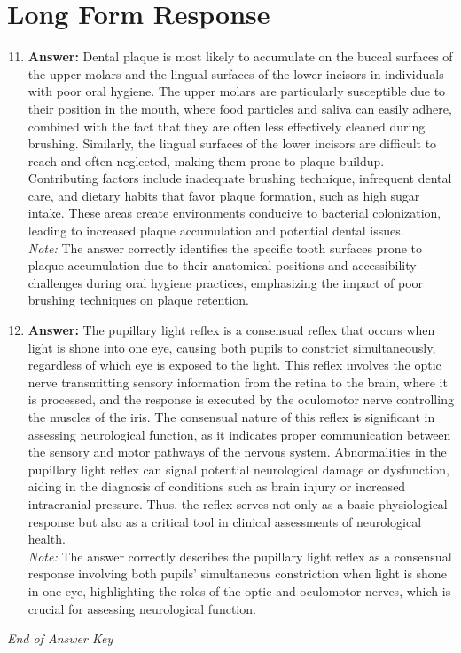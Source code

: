 \documentclass[12pt]{article}
\begin{document}
\section*{Long Form Response}
\begin{enumerate}[label=\arabic*.]
\setcounter{enumi}{10}
\item \textbf{Answer:} Dental plaque is most likely to accumulate on the buccal surfaces of the upper molars and the lingual surfaces of the lower incisors in individuals with poor oral hygiene. The upper molars are particularly susceptible due to their position in the mouth, where food particles and saliva can easily adhere, combined with the fact that they are often less effectively cleaned during brushing. Similarly, the lingual surfaces of the lower incisors are difficult to reach and often neglected, making them prone to plaque buildup. Contributing factors include inadequate brushing technique, infrequent dental care, and dietary habits that favor plaque formation, such as high sugar intake. These areas create environments conducive to bacterial colonization, leading to increased plaque accumulation and potential dental issues.
\\ \textit{Note:} The answer correctly identifies the specific tooth surfaces prone to plaque accumulation due to their anatomical positions and accessibility challenges during oral hygiene practices, emphasizing the impact of poor brushing techniques on plaque retention.
\item \textbf{Answer:} The pupillary light reflex is a consensual reflex that occurs when light is shone into one eye, causing both pupils to constrict simultaneously, regardless of which eye is exposed to the light. This reflex involves the optic nerve transmitting sensory information from the retina to the brain, where it is processed, and the response is executed by the oculomotor nerve controlling the muscles of the iris. The consensual nature of this reflex is significant in assessing neurological function, as it indicates proper communication between the sensory and motor pathways of the nervous system. Abnormalities in the pupillary light reflex can signal potential neurological damage or dysfunction, aiding in the diagnosis of conditions such as brain injury or increased intracranial pressure. Thus, the reflex serves not only as a basic physiological response but also as a critical tool in clinical assessments of neurological health.
\\ \textit{Note:} The answer correctly describes the pupillary light reflex as a consensual response involving both pupils' simultaneous constriction when light is shone in one eye, highlighting the roles of the optic and oculomotor nerves, which is crucial for assessing neurological function.
\end{enumerate}

\vfill
\noindent\textit{End of Answer Key}
\end{document}
